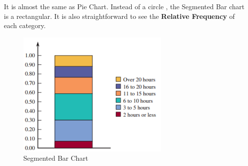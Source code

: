 \begin{Center}
\end{Center}
It is almost the same as Pie Chart. Instead of a circle , the Segmented Bar chart is a rectangular. It is also straightforward to see the \textbf{Relative Frequency} of each category.
    \begin{figure}[H]
            \centering
            \includegraphics[width=75mm]{segmented_bar_chart.png}
            \caption{Segmented Bar Chart}
            \label{segmented bar chart}
        \end{figure}

